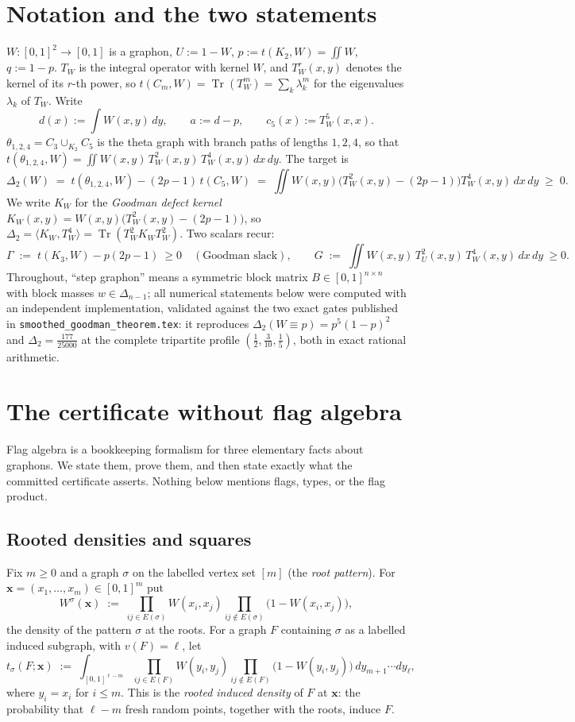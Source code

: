 \documentclass[11pt]{article}
\theoremstyle{definition}
\newcommand{\Tr}{\operatorname{Tr}}
\newcommand{\tw}{T_W}
\newcommand{\tu}{T_U}
\newcommand{\kw}{K_W}
\newcommand{\thet}{\theta_{1,2,4}}
\begin{document}
\tableofcontents

\section{Notation and the two statements}\label{sec:notation}

$W:[0,1]^2\to[0,1]$ is a graphon, $U:=1-W$, $p:=t(K_2,W)=\iint W$, $q:=1-p$.
$\tw$ is the integral operator with kernel $W$, and $\tw^r(x,y)$ denotes the
kernel of its $r$-th power, so $t(C_m,W)=\Tr(\tw^m)=\sum_k\lambda_k^m$ for the
eigenvalues $\lambda_k$ of $\tw$.  Write
\[
  d(x):=\int W(x,y)\,dy,\qquad a:=d-p,\qquad c_5(x):=\tw^5(x,x).
\]
$\thet=C_3\cup_{K_2}C_5$ is the theta graph with branch paths of lengths
$1,2,4$, so that
$t(\thet,W)=\iint W(x,y)\,\tw^2(x,y)\,\tw^4(x,y)\,dx\,dy$.  The target is
\[
  \Delta_2(W)\;=\;t(\thet,W)-(2p-1)\,t(C_5,W)
  \;=\;\iint W(x,y)\big(\tw^2(x,y)-(2p-1)\big)\tw^4(x,y)\,dx\,dy\;\ge\;0 .
\]
We write $\kw$ for the \emph{Goodman defect kernel}
$\kw(x,y)=W(x,y)\big(\tw^2(x,y)-(2p-1)\big)$, so $\Delta_2=\langle
\kw,\tw^4\rangle=\Tr(\tw^2\kw\tw^2)$.  Two scalars recur:
\[
  \Gamma\;:=\;t(K_3,W)-p(2p-1)\ \ge0 \quad(\text{Goodman slack}),
  \qquad
  G\;:=\;\iint W(x,y)\,\tu^2(x,y)\,\tw^4(x,y)\,dx\,dy\ \ge0 .
\]
Throughout, ``step graphon'' means a symmetric block matrix $B\in[0,1]^{n\times
n}$ with block masses $w\in\Delta_{n-1}$; all numerical statements below were
computed with an independent implementation, validated against the two exact
gates published in \texttt{smoothed\_goodman\_theorem.tex}: it reproduces
$\Delta_2(W\equiv p)=p^5(1-p)^2$ and $\Delta_2=\tfrac{177}{25000}$ at the
complete tripartite profile $(\tfrac12,\tfrac3{10},\tfrac15)$, both in exact
rational arithmetic.

\section{The certificate without flag algebra}\label{sec:deflag}

Flag algebra is a bookkeeping formalism for three elementary facts about
graphons.  We state them, prove them, and then state exactly what the committed
certificate asserts.  Nothing below mentions flags, types, or the flag product.

\subsection{Rooted densities and squares}

Fix $m\ge0$ and a graph $\sigma$ on the labelled vertex set $[m]$ (the
\emph{root pattern}).  For $\mathbf x=(x_1,\dots,x_m)\in[0,1]^m$ put
\[
  W^\sigma(\mathbf x)\;:=\;\prod_{ij\in E(\sigma)}W(x_i,x_j)
  \prod_{ij\notin E(\sigma)}\big(1-W(x_i,x_j)\big),
\]
the density of the pattern $\sigma$ at the roots.  For a graph $F$ containing
$\sigma$ as a labelled induced subgraph, with $v(F)=\ell$, let
\[
  t_\sigma(F;\mathbf x)\;:=\;\int_{[0,1]^{\ell-m}}
  \prod_{ij\in E(F)}W(y_i,y_j)\prod_{ij\notin E(F)}\big(1-W(y_i,y_j)\big)
  \,dy_{m+1}\cdots dy_\ell ,
\]
where $y_i=x_i$ for $i\le m$.  This is the \emph{rooted induced density} of $F$
at $\mathbf x$: the probability that $\ell-m$ fresh random points, together with
the roots, induce $F$.
\end{document}
